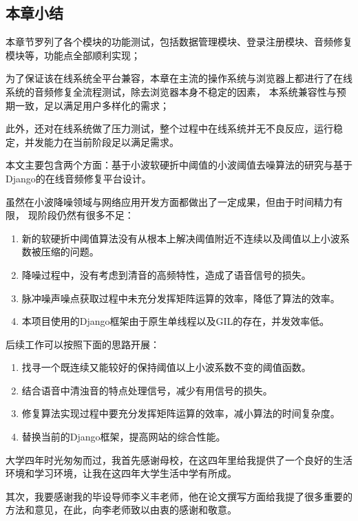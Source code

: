 \documentclass{morningstar}
\begin{document}
\subsection{本章小结}
本章节罗列了各个模块的功能测试，包括数据管理模块、登录注册模块、音频修复模块等，功能点全部顺利实现；

为了保证该在线系统全平台兼容，本章在主流的操作系统与浏览器上都进行了在线系统的音频修复全流程测试，除去浏览器本身不稳定的因素，
本系统兼容性与预期一致，足以满足用户多样化的需求；

此外，还对在线系统做了压力测试，整个过程中在线系统并无不良反应，运行稳定，并发能力在当前阶段足以满足需求。


\clearpage
{}

本文主要包含两个方面：基于小波软硬折中阈值的小波阈值去噪算法的研究与基于Django的在线音频修复平台设计。

虽然在小波降噪领域与网络应用开发方面都做出了一定成果，但由于时间精力有限，
现阶段仍然有很多不足：
\begin{enumerate}
\item 新的软硬折中阈值算法没有从根本上解决阈值附近不连续以及阈值以上小波系数被压缩的问题。
\item 降噪过程中，没有考虑到清音的高频特性，造成了语音信号的损失。 
\item 脉冲噪声噪点获取过程中未充分发挥矩阵运算的效率，降低了算法的效率。
\item 本项目使用的Django框架由于原生单线程以及GIL的存在，并发效率低。
\end{enumerate}

后续工作可以按照下面的思路开展：
\begin{enumerate}
\item 找寻一个既连续又能较好的保持阈值以上小波系数不变的阈值函数。
\item 结合语音中清浊音的特点处理信号，减少有用信号的损失。
\item 修复算法实现过程中要充分发挥矩阵运算的效率，减小算法的时间复杂度。
\item 替换当前的Django框架，提高网站的综合性能。
\end{enumerate}


\clearpage




\clearpage
{}
大学四年时光匆匆而过，我首先感谢母校，在这四年里给我提供了一个良好的生活环境和学习环境，让我在这四年大学生活中学有所成。

其次，我要感谢我的毕设导师李义丰老师，他在论文撰写方面给我提了很多重要的方法和意见，在此，向李老师致以由衷的感谢和敬意。
\end{document}
